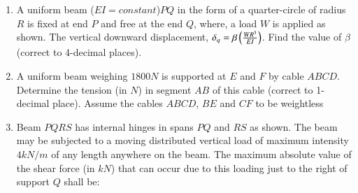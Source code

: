 \documentclass[journal]{IEEEtran}
\begin{document}
\begin{enumerate}
	\begin{figure}[H]
    		\centering
    		
    		\caption{}
    		\label{36}
	\end{figure}
	
	\item
	A uniform beam ($EI = constant$)$PQ$ in the form of a quarter-circle of radius $R$ is fixed at end $P$ and free at the end $Q$, where, a load $W$ is applied as shown. The vertical downward displacement, $\delta_{q} = \beta\left(\frac{W R^{3}}{EI}\right)$. Find the value of $\beta$(correct to 4-decimal places).
	
	\begin{figure}[H]
    		\centering
    		
    		\caption{}
    		\label{36}
	\end{figure}

	
	\item
	A uniform beam weighing $1800 N$ is supported at $E$ and $F$ by cable $ABCD$. Determine the tension (in $N$) in segment $AB$ of this cable (correct to 1-decimal place). Assume the cables $ABCD$, $BE$ and $CF$ to be weightless
	
	\begin{figure}[H]
    		\centering
    		
    		\caption{}
    		\label{36}
	\end{figure}

	
	\item
	Beam $PQRS$ has internal hinges in spans $PQ$ and $RS$ as shown. The beam may be subjected to a moving distributed vertical load of maximum intensity $4 kN/m$ of any length anywhere on the beam. The maximum absolute value of the shear force (in $kN$) that can occur due to this loading just to the right of support $Q$ shall be:
	\begin{figure}[H]
    		\centering
    		
    		\caption{}
    		\label{36}
	\end{figure}


\end{enumerate}
\end{document}
